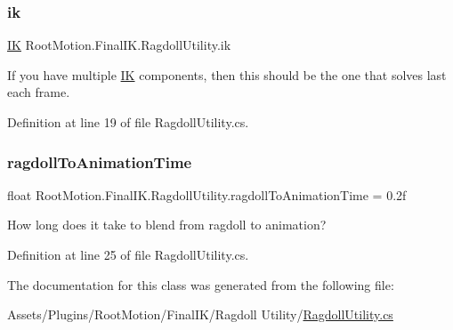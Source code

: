 \subsubsection{\texorpdfstring{ik}{ik}}
{\footnotesize\ttfamily \mbox{\hyperlink{class_root_motion_1_1_final_i_k_1_1_i_k}{IK}} Root\+Motion.\+Final\+I\+K.\+Ragdoll\+Utility.\+ik}



If you have multiple \mbox{\hyperlink{class_root_motion_1_1_final_i_k_1_1_i_k}{IK}} components, then this should be the one that solves last each frame. 



Definition at line 19 of file Ragdoll\+Utility.\+cs.

\mbox{\label{class_root_motion_1_1_final_i_k_1_1_ragdoll_utility_a9422dbe433f0d9c65adce919f15c0d7a}} 
\subsubsection{\texorpdfstring{ragdoll\+To\+Animation\+Time}{ragdollToAnimationTime}}
{\footnotesize\ttfamily float Root\+Motion.\+Final\+I\+K.\+Ragdoll\+Utility.\+ragdoll\+To\+Animation\+Time = 0.\+2f}



How long does it take to blend from ragdoll to animation? 



Definition at line 25 of file Ragdoll\+Utility.\+cs.



The documentation for this class was generated from the following file\+:\begin{DoxyCompactItemize}
\item 
Assets/\+Plugins/\+Root\+Motion/\+Final\+I\+K/\+Ragdoll Utility/\mbox{\hyperlink{_ragdoll_utility_8cs}{Ragdoll\+Utility.\+cs}}\end{DoxyCompactItemize}
